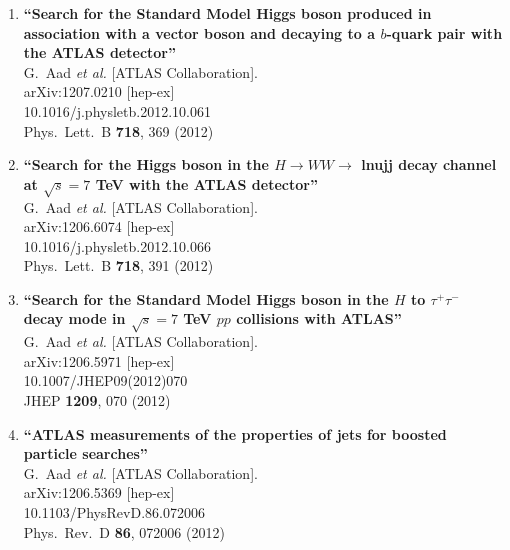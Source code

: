 \documentclass{article}
\begin{document}
\begin{enumerate}
\item%
{\bf ``Search for the Standard Model Higgs boson produced in association with a vector boson and decaying to a $b$-quark pair with the ATLAS detector''}
  \\{}G.~Aad {\it et al.}  [ATLAS Collaboration].
  \\{}arXiv:1207.0210 [hep-ex]
    \\{}10.1016/j.physletb.2012.10.061
\\{}Phys.\ Lett.\ B {\bf 718}, 369 (2012) %


\item%
{\bf ``Search for the Higgs boson in the $H \to W W \to$ lnujj decay channel at $\sqrt{s}=7$ TeV with the ATLAS detector''}
  \\{}G.~Aad {\it et al.}  [ATLAS Collaboration].
  \\{}arXiv:1206.6074 [hep-ex]
    \\{}10.1016/j.physletb.2012.10.066
\\{}Phys.\ Lett.\ B {\bf 718}, 391 (2012) %


\item%
{\bf ``Search for the Standard Model Higgs boson in the $H$ to $\tau^{+} \tau^{-}$ decay mode in $\sqrt{s}=7$ TeV $pp$ collisions with ATLAS''}
  \\{}G.~Aad {\it et al.}  [ATLAS Collaboration].
  \\{}arXiv:1206.5971 [hep-ex]
    \\{}10.1007/JHEP09(2012)070
\\{}JHEP {\bf 1209}, 070 (2012) %


\item%
{\bf ``ATLAS measurements of the properties of jets for boosted particle searches''}
  \\{}G.~Aad {\it et al.}  [ATLAS Collaboration].
  \\{}arXiv:1206.5369 [hep-ex]
    \\{}10.1103/PhysRevD.86.072006
\\{}Phys.\ Rev.\ D {\bf 86}, 072006 (2012) %



\end{enumerate}
\end{document}
